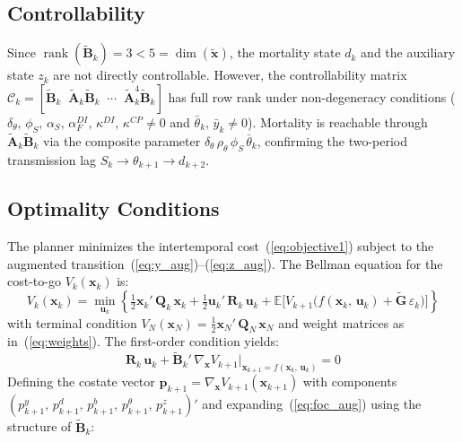 \documentclass[12pt, a4paper]{article}
\begin{document}
\subsection{Controllability}
\label{app:controllability}

Since $\operatorname{rank}(\tilde{\bm{B}}_k) = 3 < 5 =
\dim(\tilde{\bm{x}})$, the mortality state $d_k$ and the auxiliary state $z_k$
are not directly controllable. However, the controllability matrix
$\mathcal{C}_k = [\tilde{\bm{B}}_k \;\;
\tilde{\bm{A}}_k\tilde{\bm{B}}_k \;\; \cdots \;\;
\tilde{\bm{A}}_k^4\tilde{\bm{B}}_k]$ has full row rank under non-degeneracy
conditions ($\delta_\theta,\, \phi_S,\, \alpha_S,\, \alpha_F^{DI},\,
\kappa^{DI},\, \kappa^{CP} \neq 0$ and $\bar{\theta}_k,\, \bar{y}_k \neq 0$).
Mortality is reachable through $\tilde{\bm{A}}_k\tilde{\bm{B}}_k$ via the
composite parameter $\delta_\theta\,\rho_\theta\,\phi_S\,\bar{\theta}_k$,
confirming the two-period transmission lag $S_k \to \theta_{k+1} \to d_{k+2}$.

\subsection{Optimality Conditions}
\label{app:optimality}

The planner minimizes the intertemporal cost~(\ref{eq:objective1}) subject to the
augmented transition~(\ref{eq:y_aug})--(\ref{eq:z_aug}). The Bellman equation for
the cost-to-go $V_k(\bm{x}_k)$ is:
%
\begin{equation}
    V_k(\bm{x}_k) = \min_{\bm{u}_k}\left\{
    \tfrac{1}{2}\bm{x}_k'\,\bm{Q}_k\,\bm{x}_k
    + \tfrac{1}{2}\bm{u}_k'\,\bm{R}_k\,\bm{u}_k
    + \mathbb{E}\bigl[V_{k+1}\bigl(
    f(\bm{x}_k,\, \bm{u}_k) + \tilde{\bm{G}}\,\varepsilon_k
    \bigr)\bigr]\right\}
    \label{eq:bellman_aug}
\end{equation}
%
with terminal condition $V_N(\bm{x}_N) = \tfrac{1}{2}\bm{x}_N'\,\bm{Q}_N\,\bm{x}_N$
and weight matrices as in~(\ref{eq:weights}). The first-order condition yields:
%
\begin{equation}
    \bm{R}_k\, \bm{u}_k + \tilde{\bm{B}}_k'\,
    \nabla_{\bm{x}} V_{k+1}\big|_{\bm{x}_{k+1} = f(\bm{x}_k,\,\bm{u}_k)} = 0
    \label{eq:foc_aug}
\end{equation}
%
Defining the costate vector
$\bm{p}_{k+1} = \nabla_{\bm{x}} V_{k+1}(\bm{x}_{k+1})$ with components
$(p_{k+1}^y,\, p_{k+1}^d,\, p_{k+1}^b,\, p_{k+1}^\theta,\, p_{k+1}^z)'$
and expanding~(\ref{eq:foc_aug}) using the structure of $\tilde{\bm{B}}_k$:
\end{document}
